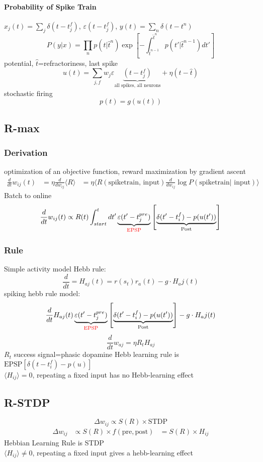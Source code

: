 \documentclass[11pt]{article}
\begin{document}
\paragraph{Probability of Spike Train}
$x_j(t)=\sum_j \delta(t-t_j^f)$, $\varepsilon(t-t_j^f)$, $y(t)=\sum_n\delta(t-t^n)$
\[
P(y\vert x)=\prod_n p(t\vert \hat{t}^n)\exp\left[-\int_{\hat{t}^{n-1}}^{\hat{t}^n}p(t'\vert \hat{t}^{n-1})dt'\right]
\]
potential, $\hat{t}$=refractoriness, last spike
\[
u(t) = \sum_{j,f}w_j\varepsilon\underbrace{(t-t_j^f)}_{\text{all spikes, all neurons}}+\eta(t-\hat{t})
\]
stochastic firing
\[
p(t)=g(u(t))
\]

\subsection{R-max}
\subsubsection{Derivation}
optimization of an objective function, reward maximization by gradient ascent
\begin{align*}
\frac{d}{dt}w_{ij}(t)&=\eta \frac{d}{dw_{ij}}\langle R \rangle
&=\eta \langle R(\text{spiketrain, input})\frac{d}{dw_{ij}}\log P(\text{spiketrain$\vert$ input}) \rangle
\end{align*}
Batch to online
\[
\frac{d}{dt}w_{ij}(t)\propto R(t)\int_{start}^t dt'\underbrace{\varepsilon(t'-t_j^{pre})}_{\text{\textcolor{red}{EPSP}}}\left[\underbrace{\delta(t'-t_i^f)-p(u(t'))}_{\text{Post}}\right]
\]

\subsubsection{Rule}
Simple activity model Hebb rule:
\[
\frac{d}{dt}=H_{aj}(t)=r(s_t)r_a(t)-g\cdot H_aj(t)\]
spiking hebb rule model:
\[
\frac{d}{dt}H_{aj}(t)\underbrace{\varepsilon(t'-t_j^{pre})}_{\text{\textcolor{red}{EPSP}}}\left[\underbrace{\delta(t'-t_i^f)-p(u(t'))}_{\text{Post}}\right]-g\cdot H_aj(t)
\]
\[
\frac{d}{dt}w_{aj}=\eta R_t H_{aj}
\]
$R_t$ success signal=phasic dopamine
Hebb learning rule is $\text{EPSP}\left[\delta(t-t_i^f)-p(u)\right]$\\
$\langle H_{ij} \rangle = 0$, repeating a fixed input has no Hebb-learning effect

\subsection{R-STDP}
\[
	\Delta w_{ij} \propto S(R)\times \text{STDP}
\]
\begin{align*}
\Delta w_{ij} &\propto S(R)\times f(\text{pre},\text{post})
&=S(R)\times H_{ij}
\end{align*}
Hebbian Learning Rule is STDP\\
$\langle H_{ij} \rangle \neq 0$, repeating a fixed input gives a hebb-learning effect
\end{document}
